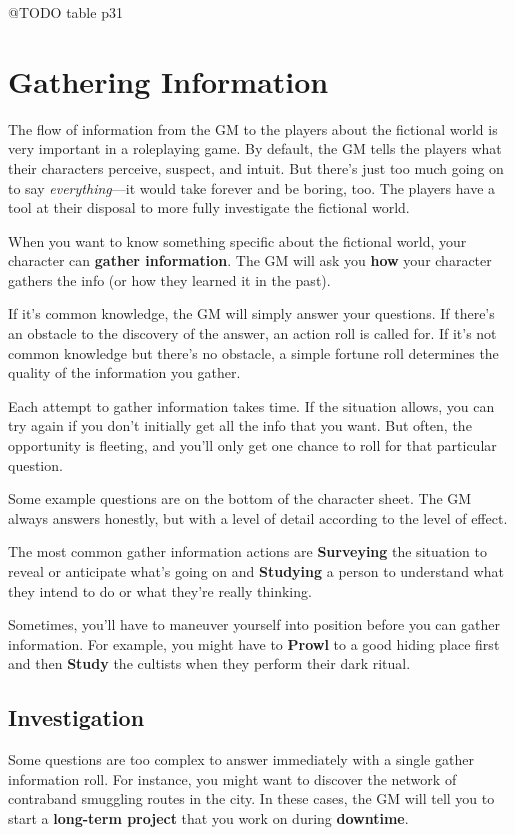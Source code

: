 \documentclass[11pt,fleqn,a5paper]{book}
\newcommand{\gameterm}[1]{\textbf{#1}}
\begin{document}
@TODO table p31

\chapter{Gathering Information}

The flow of information from the GM to the players about the fictional world is very important in a roleplaying game. By default, the GM tells the players what their characters perceive, suspect, and intuit. But there’s just too much going on to say \emph{everything}---it would take forever and be boring, too. The players have a tool at their disposal to more fully investigate the fictional world.

When you want to know something specific about the fictional world, your character can \textbf{gather information}. The GM will ask you \textbf{how} your character gathers the info (or how they learned it in the past).

If it’s common knowledge, the GM will simply answer your questions. If there’s an obstacle to the discovery of the answer, an action roll is called for. If it’s not common knowledge but there’s no obstacle, a simple fortune roll determines the quality of the information you gather.

Each attempt to gather information takes time. If the situation allows, you can try again if you don’t initially get all the info that you want. But often, the opportunity is fleeting, and you’ll only get one chance to roll for that particular question.

Some example questions are on the bottom of the character sheet. The GM always answers honestly, but with a level of detail according to the level of effect.

The most common gather information actions are \gameterm{Surveying}  the situation to reveal or anticipate what’s going on and \gameterm{Studying}  a person to understand what they intend to do or what they’re really thinking.

Sometimes, you’ll have to maneuver yourself into position before you can gather information. For example, you might have to \gameterm{Prowl}  to a good hiding place first and then \gameterm{Study}  the cultists when they perform their dark ritual.

\section{Investigation}

Some questions are too complex to answer immediately with a single gather information roll. For instance, you might want to discover the network of contraband smuggling routes in the city. In these cases, the GM will tell you to start a \textbf{long-term project} that you work on during \textbf{downtime}.
\end{document}
